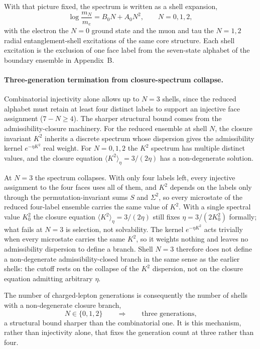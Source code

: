 \documentclass[11pt]{article}
\begin{document}
With that picture fixed, the spectrum is written as a shell expansion,
\[
\log\frac{m_N}{m_e}=B_0 N+A_0 N^2,
\qquad
N=0,1,2,
\]
with the electron the $N=0$ ground state and the muon and tau the $N=1,2$ radial entanglement-shell excitations of the same core structure. Each shell excitation is the exclusion of one face label from the seven-state alphabet of the boundary ensemble in Appendix~B.

\paragraph{Three-generation termination from closure-spectrum collapse.}
Combinatorial injectivity alone allows up to $N=3$ shells, since the reduced alphabet must retain at least four distinct labels to support an injective face assignment ($7-N\geq 4$). The sharper structural bound comes from the admissibility-closure machinery. For the reduced ensemble at shell $N$, the closure invariant $K^2$ inherits a discrete spectrum whose dispersion gives the admissibility kernel $e^{-\eta K^2}$ real weight. For $N=0,1,2$ the $K^2$ spectrum has multiple distinct values, and the closure equation $\langle K^2\rangle_\eta=3/(2\eta)$ has a non-degenerate solution.

At $N=3$ the spectrum collapses. With only four labels left, every injective assignment to the four faces uses all of them, and $K^2$ depends on the labels only through the permutation-invariant sums $S$ and $\Sigma^2$, so every microstate of the reduced four-label ensemble carries the same value of $K^2$. With a single spectral value $K_0^2$ the closure equation $\langle K^2\rangle_\eta=3/(2\eta)$ still fixes $\eta=3/(2K_0^2)$ formally; what fails at $N=3$ is selection, not solvability. The kernel $e^{-\eta K^2}$ acts trivially when every microstate carries the same $K^2$, so it weights nothing and leaves no admissibility dispersion to define a branch. Shell $N=3$ therefore does not define a non-degenerate admissibility-closed branch in the same sense as the earlier shells: the cutoff rests on the collapse of the $K^2$ dispersion, not on the closure equation admitting arbitrary $\eta$.

The number of charged-lepton generations is consequently the number of shells with a non-degenerate closure branch,
\[
N\in\{0,1,2\}\qquad\Longrightarrow\qquad\text{three generations,}
\]
a structural bound sharper than the combinatorial one. It is this mechanism, rather than injectivity alone, that fixes the generation count at three rather than four.
\end{document}
